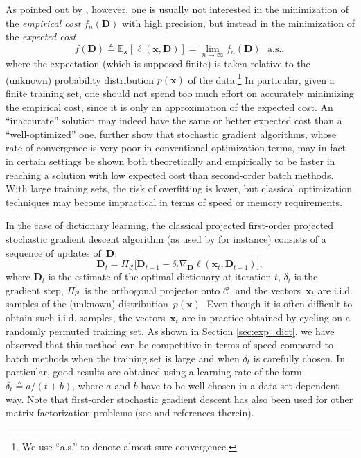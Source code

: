 \documentclass[twoside,11pt]{article}
\def\x{{\mathbf x}}
\def\l{{\ell}}
\def\as{\text{~~a.s.}}
\def\D{{\mathbf D}}
\def\E{{\mathbb E}}
\def\C{{\mathcal C}}
\def\defin{\stackrel{\vartriangle}{=}}
\begin{document}
As pointed out by \citet{bottou}, however, one is usually not interested in the minimization of the {\em empirical cost} $f_n(\D)$ with high precision, but instead in the
minimization of the {\em expected cost}
\begin{displaymath}
   f(\D) \defin \E_{\x}[\l(\x,\D)] = \lim_{n \to \infty} f_n(\D) \as,
\end{displaymath}
where the expectation (which is supposed finite) is taken relative to
the (unknown) probability distribution $p(\x)$ of the
data.\footnote{We use ``a.s.'' to denote almost sure convergence.}
In particular, given a finite training set,
one should not spend too much effort on accurately minimizing the
empirical cost, since it is only an approximation of the expected cost.
An ``inaccurate'' solution may indeed have the same or better
expected cost than a ``well-optimized'' one.
\citet{bottou} further show that stochastic gradient algorithms, whose
rate of convergence is very poor in conventional optimization terms,
may in fact in certain settings be shown both theoretically and
empirically to be faster in reaching a solution with low
expected cost than second-order batch methods.  With large training sets, the
risk of overfitting is lower, but classical optimization techniques may
become impractical in
terms of speed or memory requirements.

In the case of dictionary learning, the classical projected first-order
projected stochastic gradient descent algorithm (as used
by \citealt{aharon2,kavukcuoglu} for instance) consists of a sequence of
updates of~$\D$:
\begin{displaymath}
   \D_{t} = \Pi_\C\Big[\D_{t-1} -
   \delta_t\nabla_{\D}\l(\x_{t},\D_{t-1})\Big], 
\end{displaymath}
where $\D_t$ is the estimate of the optimal dictionary at iteration $t$,
$\delta_t$ is the gradient step, $\Pi_\C$~is the orthogonal projector onto
$\C$, and the vectors~$\x_t$ are i.i.d. samples of the (unknown) distribution~$p(\x)$. Even though it is often difficult to obtain such i.i.d. samples,
the vectors~$\x_t$ are in practice obtained by cycling on a randomly
permuted training set.
As shown in Section \ref{sec:exp_dict}, we have observed that this
method can be competitive in terms of speed compared to batch methods when
the training set is large and when $\delta_t$ is carefully chosen.
In particular, good results are obtained using a learning rate of the form
$\delta_t \defin a / (t+b)$, where $a$ and $b$ have to be well chosen in a
data set-dependent way.
Note that first-order stochastic gradient descent has also been used for other
matrix factorization problems (see \citealp{koren} and references therein).
\end{document}
